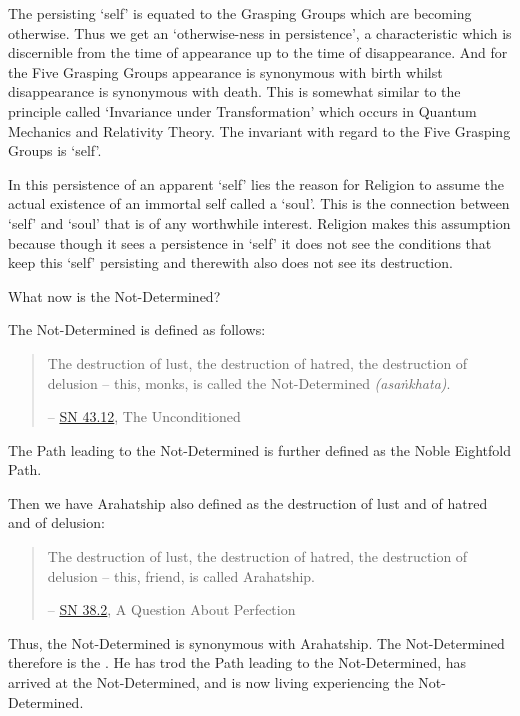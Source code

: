 The persisting `self' is equated to the Grasping Groups which are becoming otherwise. Thus we get an `otherwise-ness in persistence', a characteristic which is discernible from the time of appearance up to the time of disappearance. And for the Five Grasping Groups appearance is synonymous with birth whilst disappearance is synonymous with death. This is somewhat similar to the principle called `Invariance under Transformation' which occurs in Quantum Mechanics and Relativity Theory. The invariant with regard to the Five Grasping Groups is `self'.

In this persistence of an apparent `self' lies the reason for Religion to assume the actual existence of an immortal self called a `soul'. This is the connection between `self' and `soul' that is of any worthwhile interest. Religion makes this assumption because though it sees a persistence in `self' it does not see the conditions that keep this `self' persisting and therewith also does not see its destruction.

What now is the Not-Determined?

The Not-Determined is defined as follows:

\begin{quote}
The destruction of lust, the destruction of hatred, the destruction of delusion -- this, monks, is called the Not-Determined \emph{(asaṅkhata)}.

 -- \href{https://suttacentral.net/sn43.12/en/bodhi}{SN 43.12}, The Unconditioned
\end{quote}

The Path leading to the Not-Determined is further defined as the Noble Eightfold Path.

Then we have Arahatship also defined as the destruction of lust and of hatred and of delusion:

\begin{quote}
The destruction of lust, the destruction of hatred, the destruction of delusion -- this, friend, is called Arahatship.

 -- \href{https://suttacentral.net/sn38.2/en/sujato}{SN 38.2}, A Question About Perfection
\end{quote}

\protect\hypertarget{living-experience}{}{}Thus, the Not-Determined is synonymous with Arahatship. The Not-Determined therefore is the . He has trod the Path leading to the Not-Determined, has arrived at the Not-Determined, and is now living experiencing the Not-Determined.

